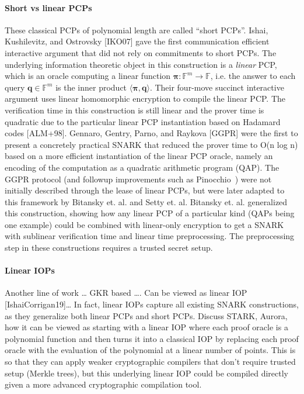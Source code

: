 \paragraph{Short vs linear PCPs} These classical PCPs of polynomial length are called ``short PCPs''. Ishai, Kushilevitz, and Ostrovsky [IKO07] gave the first communication efficient interactive argument that did not rely on commitments to short PCPs. The underlying information theoretic object in this construction is a \emph{linear} PCP, which is an oracle computing a linear function $\boldsymbol{\pi}: \mathbb{F}^m \rightarrow \mathbb{F}$, i.e. the answer to each query $\mathbf{q} \in \mathbb{F}^m$ is the inner product $\langle \boldsymbol{\pi}, \mathbf{q} \rangle$. Their four-move succinct interactive argument uses linear homomorphic encryption to compile the linear PCP. The verification time in this construction is still linear and the prover time is quadratic due to the particular linear PCP instantiation based on Hadamard codes [ALM+98]. Gennaro, Gentry, Parno, and Raykova [GGPR] were the first to present a concretely practical SNARK that reduced the prover time to O(n log n) based on a more efficient instantiation of the linear PCP oracle, namely an encoding of the computation as a quadratic arithmetic program (QAP). The GGPR protocol (and followup improvements such as Pinocchio~\cite{Pinocchio}) were not initially described through the lease of linear PCPs, but were later adapted to this framework by Bitansky et. al. and Setty et. al. Bitansky et. al. generalized this construction, showing how any linear PCP of a particular kind (QAPs being one example) could be combined with linear-only encryption to get a SNARK with sublinear verification time and linear time preprocessing. The preprocessing step in these constructions requires a trusted secret setup. 

\paragraph{Linear IOPs} Another line of work … GKR based …. Can be viewed as linear IOP [IshaiCorrigan19]… In fact, linear IOPs capture all existing SNARK constructions, as they generalize both linear PCPs and short PCPs. Discuss STARK, Aurora, how it can be viewed as starting with a linear IOP where each proof oracle is a polynomial function and then turns it into a classical IOP by replacing each proof oracle with the evaluation of the polynomial at a linear number of points. This is so that they can apply weaker cryptographic compilers that don't require trusted setup (Merkle trees), but this underlying linear IOP could be compiled directly given a more advanced cryptographic compilation tool. 

